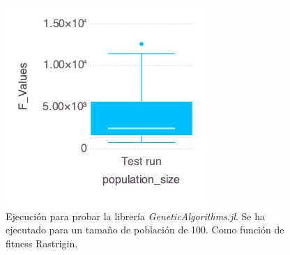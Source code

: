 \begin{figure}[H]
	\centering	
	\includegraphics[scale=0.6]{../data/Plots/comparation.png}
	\caption{Ejecución para probar la librería \emph{GeneticAlgorithms.jl}. Se ha ejecutado para un tamaño de población de 100. Como función de fitness Rastrigin.}
    \label{fig:genetic_algorithms_jl}
\end{figure}

